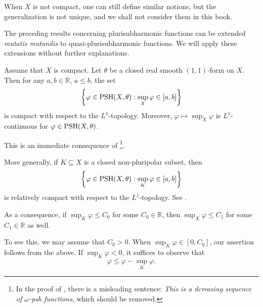 When $X$ is not compact, one can still define similar notions, but the generalization is not unique, and we shall not consider them in this book.
\begin{remark}
The preceding results concerning plurisubharmonic functions can be extended \emph{mutatis mutandis} to quasi-plurisubharmonic functions. We will apply these extensions without further explanations.
\end{remark}



\begin{proposition}\label{prop:L1compa}Assume that $X$ is compact.
    Let $\theta$ be a closed real smooth $(1,1)$-form on $X$. Then for any $a,b\in \mathbb{R}$, $a\leq b$, the set
    \[
        \left\{ \varphi\in \mathrm{PSH}(X,\theta): \sup_X \varphi \in [a,b]\right\}
    \]
    is compact with respect to the $L^1$-topology. Moreover, $\varphi\mapsto \sup_X \varphi$ is $L^1$-continuous for $\varphi\in \mathrm{PSH}(X,\theta)$.
\end{proposition}
This is an immediate consequence of \cite[Proposition~8.5, Exercise~1.20]{GZ17}\footnote{In the proof of \cite[Proposition~8.5]{GZ17}, there is a misleading sentence: \emph{This is a dcreasing sequence of $\omega$-psh functions}, which should be removed.}.
\begin{remark}\label{rmk:L1cpt}
    More generally, if $K\subseteq X$ is a closed non-pluripolar subset, then
    \[
        \left\{ \varphi\in \mathrm{PSH}(X,\theta): \sup_K \varphi \in [a,b]\right\}
    \]
    is relatively compact with respect to the $L^1$-topology. See \cite[Corollary~4.3]{GZ05}.

    As a consequence, if $\sup_K \varphi\leq C_0$ for some $C_0\in \mathbb{R}$, then $\sup_X \varphi\leq C_1$ for some $C_1\in \mathbb{R}$ as well.

    To see this, we may assume that $C_0>0$. When $\sup_K \varphi \in [0,C_0]$, our assertion follows from the above. If $\sup_K \varphi<0$, it suffices to observe that
    \[
        \varphi\leq \varphi-\sup_K \varphi.
    \]
\end{remark}

